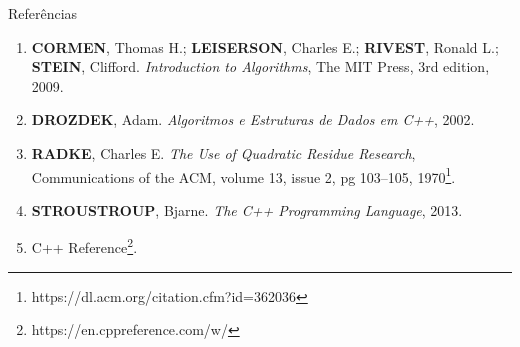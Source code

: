 \begin{frame}[fragile]{Referências}

    \begin{enumerate}
        \item \textbf{CORMEN}, Thomas H.; \textbf{LEISERSON}, Charles E.; \textbf{RIVEST},
            Ronald L.; \textbf{STEIN}, Clifford. \textit{Introduction to Algorithms}, The MIT
            Press, 3rd edition, 2009.

        \item \textbf{DROZDEK}, Adam. \textit{Algoritmos e Estruturas de Dados em C++}, 2002.

        \item \textbf{RADKE}, Charles E. \textit{The Use of Quadratic Residue Research},
            Communications of the ACM, volume 13, issue 2, pg 103--105, 1970\footnote{https://dl.acm.org/citation.cfm?id=362036}.

        \item \textbf{STROUSTROUP}, Bjarne. \textit{The C++ Programming Language}, 2013.

		\item C++ Reference\footnote{https://en.cppreference.com/w/}.
    \end{enumerate}

\end{frame}

